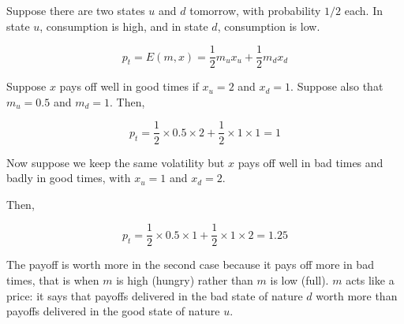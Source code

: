 \begin{tcolorbox}[colback=white, colframe=black, title=Example 1]
Suppose there are two states $u$ and $d$ tomorrow, with probability
$1/2$ each. In state $u$, consumption is high, and in state $d$,
consumption is low.

\begin{equation}
    p_t = E(m, x) = \frac{1}{2} m_u x_u + \frac{1}{2} m_d x_d
\end{equation}


Suppose $x$ pays off well in good times if $x_u = 2$ and 
$x_d = 1$. Suppose also that $m_u = 0.5$ and $m_d = 1$. 
Then,

\begin{equation}
    p_t = \frac{1}{2} \times 0.5 \times 2 + \frac{1}{2} \times 1 \times 1 = 1
\end{equation}

Now suppose we keep the same volatility but $x$ pays off well 
in bad times and badly in good times, with $x_u = 1$ and $x_d = 2$.

Then,

\begin{equation}
    p_t = \frac{1}{2} \times 0.5 \times 1 + \frac{1}{2} \times 1 \times 2 = 1.25
\end{equation}

The payoff is worth more in the second case because it pays off
more in bad times, that is when $m$ is high (hungry) rather 
than $m$ is low (full). 
$m$ acts like a price: it says that payoffs 
delivered in the bad state of nature $d$ worth more than 
payoffs delivered in the good state of nature $u$.

\end{tcolorbox}